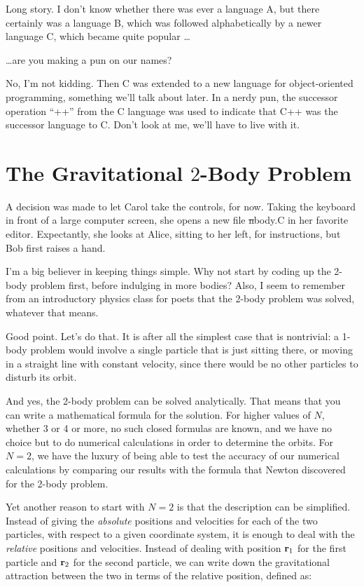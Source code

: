 \carol
Long story.  I don't know whether there was ever a language A, but
there certainly was a language B, which was followed alphabetically by
a newer language C, which became quite popular \dots

\bob
\dots are you making a pun on our names?

\carol
No, I'm not kidding.  Then C was extended to a new language for
object-oriented programming, something we'll talk about later.  In a
nerdy pun, the successor operation ``++'' from the C language was used
to indicate that C++ was the successor language to C.  Don't look at
me, we'll have to live with it.

\cba

\section{The Gravitational $2$-Body Problem}

A decision was made to let Carol take the controls, for now.  Taking
the keyboard in front of a large computer screen, she opens a new file
{\st nbody.C} in her favorite editor.  Expectantly, she looks at Alice,
sitting to her left, for instructions, but Bob first raises a hand.

\abc

\bob
I'm a big believer in keeping things simple.  Why not start by coding up
the 2-body problem first, before indulging in more bodies?  Also, I
seem to remember from an introductory physics class for poets that the
2-body problem was solved, whatever that means.

\alice
Good point.  Let's do that.  It is after all the simplest case that is
nontrivial: a 1-body problem would involve a single particle that is
just sitting there, or moving in a straight line with constant velocity,
since there would be no other particles to disturb its orbit.

And yes, the 2-body problem can be solved analytically.  That means
that you can write a mathematical formula for the solution.  For
higher values of $N$, whether 3 or 4 or more, no such closed formulas
are known, and we have no choice but to do numerical calculations in
order to determine the orbits.  For $N=2$, we have the luxury of being
able to test the accuracy of our numerical calculations by comparing
our results with the formula that Newton discovered for the 2-body
problem.

Yet another reason to start with $N=2$ is that the description can be
simplified.  Instead of giving the {\it absolute} positions and
velocities for each of the two particles, with respect to a given
coordinate system, it is enough to deal with the {\it relative}
positions and velocities.  Instead of dealing with position ${\bf r}_1$
for the first particle and ${\bf r}_2$ for the second particle, we can
write down the gravitational attraction between the two in terms of
the relative position, defined as:

